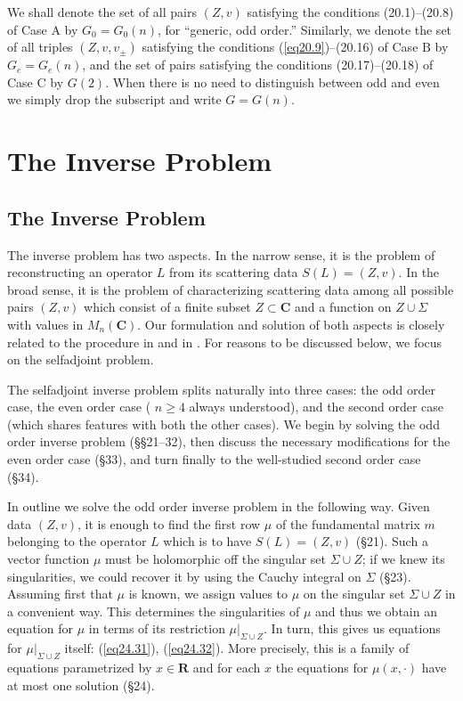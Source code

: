 \documentclass{surv-l}
\theoremstyle{plain}
\theoremstyle{definition}
\numberwithin{equation}{chapter}
\begin{document}
We shall denote the set of all pairs $(Z, v)$ satisfying the
conditions (20.1)--(20.8) of Case A by $G_{0}=G_{0}(n)$, for ``generic, odd order.'' Similarly, we denote the set of all triples $(Z, v, v_{\pm})$ satisfying the conditions (\ref{eq20.9})--(20.16) of Case $\mathrm{B}$ by $G_{e}=G_{e}(n)$, and the set of pairs satisfying the conditions (20.17)--(20.18) of Case C by $G(2)$. When there is no need to distinguish between odd and even we simply drop the subscript and write $G=G(n)$.

\part{The Inverse Problem}\label{partII}

\chapter{The Inverse Problem}

The inverse problem has two aspects. In the narrow sense, it is the problem of reconstructing an operator $L$ from its scattering data $S(L)=(Z, v)$. In the broad sense, it is the problem of characterizing scattering data among all possible pairs $(Z, v)$ which consist of a finite subset $Z\subset \mathbf{C}$ and a function on $ Z\cup\Sigma$ with values in $M_{n}(\mathbf{C})$. Our formulation and solution of both aspects is closely related to the procedure in \cite{BC1} and in \cite{Be}. For reasons to be discussed below, we focus on the selfadjoint problem.

The selfadjoint inverse problem splits naturally into three cases: the odd order case, the even order case ( $n\geq 4$ always understood), and the second order case (which shares features with both the other cases). We begin by solving the odd order inverse problem (\S\S 21--32), then discuss the necessary modifications for the even order case (\S 33), and turn finally to the well-studied second order case (\S 34).

In outline we solve the odd order inverse problem in the following way. Given data $(Z, v)$, it is enough to find the first row $\mu$ of the fundamental matrix $m$ belonging to the operator $L$ which is to have $S(L)=(Z, v)$ (\S 21). Such a vector function $\mu$ must be holomorphic off the singular set $\Sigma\cup Z$; if we knew its singularities, we could recover it by using the Cauchy integral on $\Sigma$ (\S 23). Assuming first that $\mu$ is known, we assign values to $\mu$ on the singular set $\Sigma\cup Z$ in a convenient way. This determines the singularities of $\mu$ and thus we obtain an equation for $\mu$ in terms of its restriction $\mu|_{\Sigma{\cup} Z}$. In turn, this gives us equations for $\mu|_{\Sigma{\cup} Z}$ itself: (\ref{eq24.31}), (\ref{eq24.32}). More precisely, this is a family of equations parametrized by $x\in \mathbf{R}$ and for each $x$ the equations for $\mu(x,\cdot)$ have at most one solution (\S 24).
\end{document}
